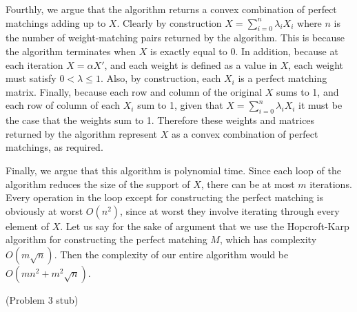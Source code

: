 \documentclass{hmcpset}
\begin{document}
\begin{solution}
\begin{enumerate}
Fourthly, we argue that the algorithm returns a convex combination of perfect
matchings adding up to $X$. Clearly by construction $X = \sum_{i = 0}^n{\lambda_i X_i}$
where $n$ is the number of weight-matching pairs returned by the algorithm.
This is because the algorithm terminates when $X$ is exactly equal to 0.
In addition, because at each iteration $X = \alpha X'$, and each weight is
defined as a value in $X$, each weight must satisfy $0 < \lambda \leq 1$.
Also, by construction, each $X_i$ is a perfect matching matrix.
Finally, because each row and column of the original $X$ sums to 1,
and each row of column of each $X_i$ sum to 1, given that
$X = \sum_{i = 0}^n{\lambda_i X_i}$ it must be the case that the weights
sum to 1. Therefore these weights and matrices returned by the algorithm
represent $X$ as a convex combination of perfect matchings, as required.

Finally, we argue that this algorithm is polynomial time. Since each loop
of the algorithm reduces the size of the support of $X$, there can be at
most $m$ iterations. Every operation in the loop except for constructing
the perfect matching is obviously at worst $O(n^2)$, since at worst they
involve iterating through every element of $X$. Let us say for the sake of
argument that we use the Hopcroft-Karp algorithm for constructing the
perfect matching $M$, which has complexity $O(m\sqrt{n})$. Then the
complexity of our entire algorithm would be $O(mn^2 + m^2\sqrt{n})$.

\end{enumerate}
\end{solution}
\begin{problem}[3]
(Problem 3 stub)
\end{problem}
\end{document}
